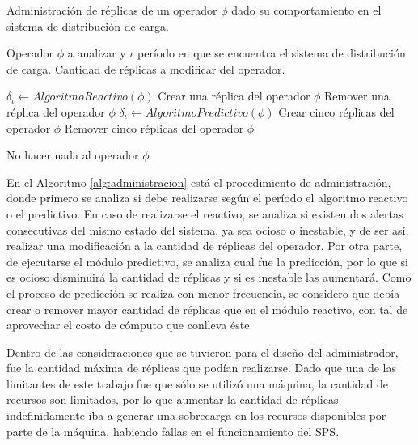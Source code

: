 \begin{algorithm}[!hb]
	\caption{Administración de réplicas de un operador $\phi$ dado su comportamiento en el sistema de distribución de carga.}
	\label{alg:administracion}
	\begin{algorithmic}[1]
	\REQUIRE Operador $\phi$ a analizar y $\iota$ período en que se encuentra el sistema de distribución de carga.
	\ENSURE Cantidad de réplicas a modificar del operador.	
	
		\STATE $\delta_{\iota} \leftarrow AlgoritmoReactivo(\phi)$
				\RETURN Crear una réplica del operador $\phi$
			\ENDIF
			\RETURN Remover una réplica del operador $\phi$
		\ENDIF 
	\ELSE
		\STATE $\delta_{\iota} \leftarrow AlgoritmoPredictivo(\phi)$
				\RETURN Crear cinco réplicas del operador $\phi$
			\ENDIF
			\RETURN Remover cinco réplicas del operador $\phi$
		\ENDIF
	\ENDIF
	
	\RETURN No hacer nada al operador $\phi$
	
	\end{algorithmic}
\end{algorithm}

En el Algoritmo \ref{alg:administracion} está el procedimiento de administración, donde primero se analiza si debe realizarse según el período el algoritmo reactivo o el predictivo. En caso de realizarse el reactivo, se analiza si existen dos alertas consecutivas del mismo estado del sistema, ya sea ocioso o inestable, y de ser así, realizar una modificación a la cantidad de réplicas del operador. Por otra parte, de ejecutarse el módulo predictivo, se analiza cual fue la predicción, por lo que si es ocioso disminuirá la cantidad de réplicas y si es inestable las aumentará. Como el proceso de predicción se realiza con menor frecuencia, se considero que debía crear o remover mayor cantidad de réplicas que en el módulo reactivo, con tal de aprovechar el costo de cómputo que conlleva éste.

Dentro de las consideraciones que se tuvieron para el diseño del administrador, fue la cantidad máxima de réplicas que podían realizarse. Dado que una de las limitantes de este trabajo fue que sólo se utilizó una máquina, la cantidad de recursos son limitados, por lo que aumentar la cantidad de réplicas indefinidamente iba a generar una sobrecarga en los recursos disponibles por parte de la máquina, habiendo fallas en el funcionamiento del SPS.